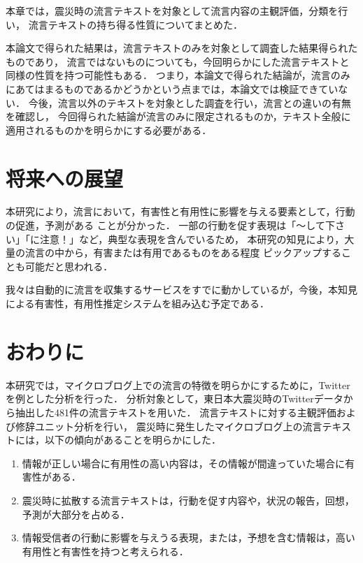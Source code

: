 \documentclass[japanese]{jnlp_1.4}
\begin{document}
本章では，震災時の流言テキストを対象として流言内容の主観評価，分類を行い，
流言テキストの持ち得る性質についてまとめた．

本論文で得られた結果は，流言テキストのみを対象として調査した結果得られたものであり，
流言ではないものについても，今回明らかにした流言テキストと同様の性質を持つ可能性もある．
つまり，本論文で得られた結論が，流言のみにあてはまるものであるかどうかという点までは，本論文では検証できていない．
今後，流言以外のテキストを対象とした調査を行い，流言との違いの有無を確認し，
今回得られた結論が流言のみに限定されるものか，テキスト全般に適用されるものかを明らかにする必要がある．


\section{将来への展望}

本研究により，流言において，有害性と有用性に影響を与える要素として，行動の促進，予測がある
ことが分かった．
一部の行動を促す表現は「〜して下さい」「に注意！」など，典型な表現を含んでいるため，
本研究の知見により，大量の流言の中から，有害または有用であるものをある程度
ピックアップすることも可能だと思われる．

我々は自動的に流言を収集するサービスをすでに動かしているが\cite{Article_MiyabeRakuten,Article_MiyabeDICOMO}，今後，本知見
による有害性，有用性推定システムを組み込む予定である．


\section{おわりに}

本研究では，マイクロブログ上での流言の特徴を明らかにするために，Twitterを例とした分析を行った．
分析対象として，東日本大震災時のTwitterデータから抽出した481件の流言テキストを用いた．
流言テキストに対する主観評価および修辞ユニット分析を行い，
震災時に発生したマイクロブログ上の流言テキストには，以下の傾向があることを明らかにした．

\begin{enumerate}
\item 情報が正しい場合に有用性の高い内容は，その情報が間違っていた場合に有害性がある．
\item 震災時に拡散する流言テキストは，行動を促す内容や，状況の報告，回想，予測が大部分を占める．
\item 情報受信者の行動に影響を与えうる表現，または，予想を含む情報は，高い有用性と有害性を持つと考えられる．
\end{enumerate}
\end{document}

